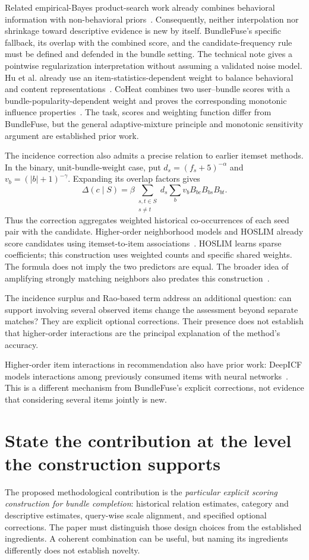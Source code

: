 \documentclass[11pt,a4paper]{article}
\begin{document}
Related empirical-Bayes product-search work already combines behavioral information
with non-behavioral priors~\cite{han}. Consequently, neither interpolation nor
shrinkage toward descriptive evidence is new by itself. BundleFuse's specific
fallback, its overlap with the combined score, and the candidate-frequency rule
must be defined and defended in the bundle setting. The technical note gives a
pointwise regularization interpretation without assuming a validated noise model.
Hu et al. already use an item-statistics-dependent weight to balance behavioral
and content representations~\cite{hu}. CoHeat combines two user--bundle scores
with a bundle-popularity-dependent weight and proves the corresponding
monotonic influence properties~\cite{coheat}. The task, scores and weighting
function differ from BundleFuse, but the general adaptive-mixture principle and
monotonic sensitivity argument are established prior work.

The incidence correction also admits a precise relation to earlier itemset
methods. In the binary, unit-bundle-weight case, put
$d_s=(f_s+5)^{-\alpha}$ and $v_b=(|b|+1)^{-\gamma}$. Expanding its overlap
factors gives
\[
 \Delta(c\mid S)=\beta\!\sum_{\substack{s,t\in S\\s\ne t}}\!d_s
       \sum_b v_b B_{bc}B_{bs}B_{bt}.
\]
Thus the correction aggregates weighted historical co-occurrences of each
seed pair with the candidate. Higher-order neighborhood models and
HOSLIM already score candidates using itemset-to-item associations~\cite{hoslim}.
HOSLIM learns sparse coefficients; this construction uses weighted counts and
specific shared weights. The formula does not imply the two predictors are equal.
The broader idea of amplifying strongly matching neighbors also predates this
construction~\cite{breese,kelen}.

The incidence surplus and Rao-based term address an additional question: can support
involving several observed items change the assessment beyond separate matches?
They are explicit optional corrections. Their presence does not establish that
higher-order interactions are the principal explanation of the method's accuracy.

Higher-order item interactions in recommendation also have prior work: DeepICF
models interactions among previously consumed items with neural
networks~\cite{deepicf}. This is a different mechanism from BundleFuse's explicit
corrections, not evidence that considering several items jointly is new.

\section{State the contribution at the level the construction supports}
The proposed methodological contribution is the \emph{particular explicit scoring
construction for bundle completion}: historical relation estimates, category and
descriptive estimates, query-wise scale alignment, and specified optional corrections.
The paper must distinguish those design choices from the established ingredients.
A coherent combination can be useful, but naming its ingredients differently does
not establish novelty.
\end{document}
